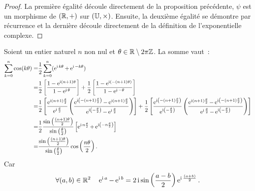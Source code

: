 \begin{proof}
	La première égalité découle directement de la proposition précédente, \(\psi\) est un morphisme de \((\mathbb{R},+)\) sur \((\mathbb{U},\times)\). Ensuite, la deuxième égalité se démontre par récurrence et la dernière découle directement de la définition de l'exponentielle complexe.
\end{proof}

Soient un entier naturel \(n\) non nul et \(\theta \in \mathbb{R} \setminus 2\pi\mathbb{Z}\). La somme vaut~:
\begin{align}
  \sum_{k=0}^n \cos(k\theta) =& \frac{1}{2} \sum_{k=0}^n (\operatorname{e}^{\operatorname{i} k \theta} + \operatorname{e}^{\operatorname{i} -k \theta})\\
  =&\frac{1}{2} \left[\frac{1-\operatorname{e}^{\operatorname{i} (n+1)\theta}}{1-\operatorname{e}^{\operatorname{i} \theta}}\right] + \frac{1}{2} \left[\frac{1-\operatorname{e}^{\operatorname{i} (-(n+1) \theta)}}{1-\operatorname{e}^{\operatorname{i} -\theta}}\right]\\
  =&\frac{1}{2} \left[\frac{\operatorname{e}^{\operatorname{i} (n+1) \frac{\theta}{2}}}{\operatorname{e}^{\operatorname{i} \frac{\theta}{2}}} \left(\frac{\operatorname{e}^{\operatorname{i} \left(-(n+1) \frac{\theta}{2}\right)}-\operatorname{e}^{\operatorname{i} (n+1) \frac{\theta}{2}}}{\operatorname{e}^{\operatorname{i} \left(-\frac{\theta}{2}\right)} - \operatorname{e}^{\operatorname{i} \frac{\theta}{2}}} \right)\right] \notag + \frac{1}{2} \left[\frac{\operatorname{e}^{\operatorname{i} \left(-(n+1) \frac{\theta}{2}\right)}}{\operatorname{e}^{\operatorname{i} \left(-\frac{\theta}{2}\right)}} \left(\frac{\operatorname{e}^{\operatorname{i} (n+1) \frac{\theta}{2}}-\operatorname{e}^{\operatorname{i} \left(-(n+1) \frac{\theta}{2}\right)}}{\operatorname{e}^{\operatorname{i} \frac{\theta}{2}} - \operatorname{e}^{\operatorname{i} \left(-\frac{\theta}{2}\right)}} \right)\right] \\
  =& \frac{1}{2} \frac{\sin \left(\frac{(n+1)\theta}{2} \right)}{\sin \left( \frac{\theta}{2} \right)} \left[\operatorname{e}^{\operatorname{i} n \frac{\theta}{2}} +\operatorname{e}^{\operatorname{i} \left(-n \frac{\theta}{2}\right)} \right] \\
  =& \frac{\sin \left(\frac{(n+1)\theta}{2} \right)}{\sin \left( \frac{\theta}{2} \right)} \cos \left( \frac{n\theta}{2} \right).
\end{align}
%
Car
\begin{equation}
  \forall (a,b) \in \mathbb{R}^2 \quad \operatorname{e}^{\operatorname{i} a}-\operatorname{e}^{\operatorname{i} b}=2\operatorname{i} \sin\left(\frac{a-b}{2}\right)\operatorname{e}^{\operatorname{i} \frac{(a+b)}{2}}.
\end{equation}

